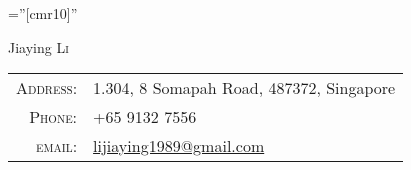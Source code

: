 \documentclass[a4paper,10pt]{article}
\begin{document}
\pagestyle{empty} %

\font\fb=''[cmr10]'' %

\par{\centering
		{\Huge Jiaying \textsc{Li}
	}\bigskip\par}


\begin{tabular}{rl}
    \textsc{Address:}   & 1.304, 8 Somapah Road, 487372, Singapore\\
    \textsc{Phone:}     & +65 9132 7556\\
    \textsc{email:}     & \href{mailto:lijiaying1989@gmail.com}{lijiaying1989@gmail.com}
\end{tabular}

\end{document}

